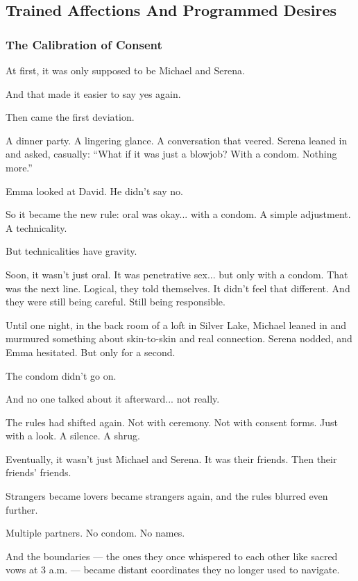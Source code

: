
\subsection{Trained Affections And Programmed Desires}

\subsubsection{The Calibration of Consent}

At first, it was only supposed to be Michael and Serena.

And that made it easier to say yes again.

Then came the first deviation.

A dinner party. A lingering glance. A conversation that veered. Serena leaned in and asked, casually: 
``What if it was just a blowjob? With a condom. Nothing more.''

Emma looked at David. He didn’t say no.

So it became the new rule: oral was okay... with a condom.
A simple adjustment. A technicality.

But technicalities have gravity.

Soon, it wasn’t just oral.
It was penetrative sex... but only with a condom.
That was the next line. Logical, they told themselves. It didn’t feel that different. And they were 
still being careful. Still being responsible.

Until one night, in the back room of a loft in Silver Lake, Michael leaned in and murmured something 
about skin-to-skin and real connection. Serena nodded, and Emma hesitated. But only for a second.

The condom didn’t go on.

And no one talked about it afterward... not really.

The rules had shifted again.
Not with ceremony. Not with consent forms.
Just with a look. A silence. A shrug.

Eventually, it wasn’t just Michael and Serena.
It was their friends.
Then their friends’ friends.

Strangers became lovers became strangers again, and the rules blurred even further.

Multiple partners.
No condom.
No names.

And the boundaries --- the ones they once whispered to each other like sacred vows at 
3 a.m. --- became distant coordinates they no longer used to navigate.

